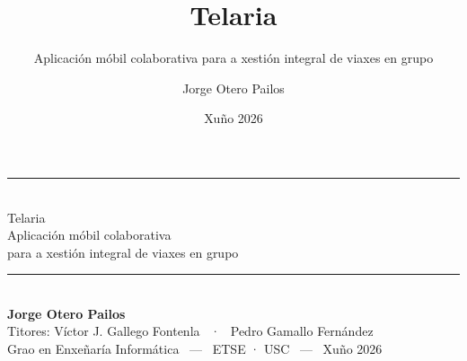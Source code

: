 \documentclass[11pt,aspectratio=169]{beamer}
\title{Telaria}
\subtitle{Aplicación móbil colaborativa para a xestión integral de viaxes en grupo}
\author{Jorge Otero Pailos}
\institute{Titores: Víctor J. Gallego Fontenla \and Pedro Gamallo Fernández}
\date{Xuño 2026}
\begin{document}
\begin{frame}
  \vfill
  \begin{center}
    {\color{telPrimary}\rule{0.35\textwidth}{2pt}}\\[1.2em]
    {\color{telDeep} Telaria}\\[0.6em]
    {\large\color{telInk} Aplicación móbil colaborativa\\ para a xestión integral de viaxes en grupo}\\[1.6em]
    {\color{telPrimary}\rule{0.35\textwidth}{2pt}}\\[1.6em]
    {\normalsize\bfseries\color{telInk} Jorge Otero Pailos}\\[0.4em]
    {\small\color{telGrey} Titores: Víctor J. Gallego Fontenla \ · \ Pedro Gamallo Fernández}\\[0.8em]
    {\small\color{telGrey} Grao en Enxeñaría Informática \ — \ ETSE · USC \ — \ Xuño 2026}
  \end{center}
  \vfill
\end{frame}
\end{document}
